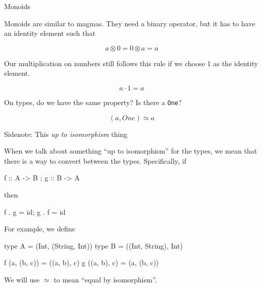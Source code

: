 \documentclass[ignorenonframetext,]{beamer}
\begin{document}
\begin{frame}[fragile]{Monoids}

Monoids are similar to magmas. They need a binary operator, but it has
to have an identity element such that

\[
a \otimes 0 = 0 \otimes a = a
\]

\pause

Our multiplication on numbers still follows this rule if we choose 1 as
the identity element.

\[
a \cdot 1 = a
\]

\pause

On types, do we have the same property? Is there a \texttt{One}?

\[
(a, One) \simeq a
\]

\end{frame}

\begin{frame}[fragile]{Sidenote: This \emph{up to isomorphism} thing}

When we talk about something ``up to isomorphism'' for the types, we
mean that there is a way to convert between the types. Specifically, if

\begin{haskellcode}
f :: A -> B ; g :: B -> A
\end{haskellcode}

then

\begin{haskellcode}
f . g = id; g . f = id
\end{haskellcode}

\pause

For example, we define

\begin{haskellcode}
type A = (Int, (String, Int))
type B = ((Int, String), Int)

f (a, (b, c)) = ((a, b), c)
g ((a, b), c) = (a, (b, c))
\end{haskellcode}

We will use \(\simeq\) to mean ``equal by isomorphism''.

\end{frame}
\end{document}
